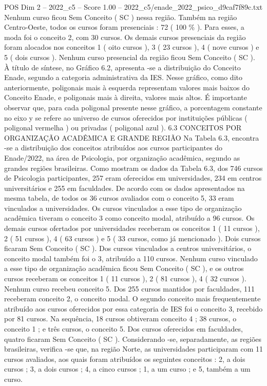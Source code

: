 \begin{textsample}{POS Dim 2 – 2022\_c5 – Score 1.00 – 2022\_c5/enade\_2022\_psico\_d9caf7f89c.txt}
Nenhum curso ficou Sem Conceito ( SC ) nessa região.
Também na região Centro-Oeste, todos os cursos foram presenciais : 72 ( 100 \% ).
Para esses, a moda foi o conceito 2, com 30 cursos.
Os demais cursos presenciais da região foram alocados nos conceitos 1 ( oito cursos ), 3 ( 23 cursos ), 4 ( nove cursos ) e 5 ( dois cursos ).
Nenhum curso presencial da região ficou Sem Conceito ( SC ).
À título de síntese, no Gráfico 6.2, apresenta -se a distribuição do Conceito Enade, segundo a categoria administrativa da IES.
Nesse gráfico, como dito anteriormente, poligonais mais à esquerda representam valores mais baixos do Conceito Enade, e poligonais mais à direita, valores mais altos.
É importante observar que, para cada poligonal presente nesse gráfico, a porcentagem constante no eixo y se refere ao universo de cursos oferecidos por instituições públicas ( poligonal vermelha ) ou privadas ( poligonal azul ). 6.3 CONCEITOS POR ORGANIZAÇÃO ACADÊMICA E GRANDE REGIÃO Na Tabela 6.3, encontra -se a distribuição dos conceitos atribuídos aos cursos participantes do Enade/2022, na área de Psicologia, por organização acadêmica, segundo as grandes regiões brasileiras.
Como mostram os dados da Tabela 6.3, dos 746 cursos de Psicologia participantes, 257 eram oferecidos em universidades, 234 em centros universitários e 255 em faculdades.
De acordo com os dados apresentados na mesma tabela, de todos os 36 cursos avaliados com o conceito 5, 33 eram vinculados a universidades.
Os cursos vinculados a esse tipo de organização acadêmica tiveram o conceito 3 como conceito modal, atribuído a 96 cursos.
Os demais cursos ofertados por universidades receberam os conceitos 1 ( 11 cursos ), 2 ( 51 cursos ), 4 ( 63 cursos ) e 5 ( 33 cursos, como já mencionado ).
Dois cursos ficaram Sem Conceito ( SC ).
Dos cursos vinculados a centros universitários, o conceito modal também foi o 3, atribuído a 110 cursos.
Nenhum curso vinculado a esse tipo de organização acadêmica ficou Sem Conceito ( SC ), e os outros cursos receberam os conceitos 1 ( 11 cursos ), 2 ( 81 cursos ), 4 ( 32 cursos ).
Nenhum curso recebeu conceito 5.
Dos 255 cursos mantidos por faculdades, 111 receberam conceito 2, o conceito modal.
O segundo conceito mais frequentemente atribuído aos cursos oferecidos por essa categoria de IES foi o conceito 3, recebido por 81 cursos.
Na sequência, 18 cursos obtiveram conceito 4 ; 38 cursos, o conceito 1 ; e três cursos, o conceito 5.
Dos cursos oferecidos em faculdades, quatro ficaram Sem Conceito ( SC ).
Considerando -se, separadamente, as regiões brasileiras, verifica -se que, na região Norte, as universidades participaram com 11 cursos avaliados, aos quais foram atribuídos os seguintes conceitos : 2, a dois cursos ; 3, a dois cursos ; 4, a cinco cursos ; 1, a um curso ; e 5, também a um curso.

\end{textsample}
